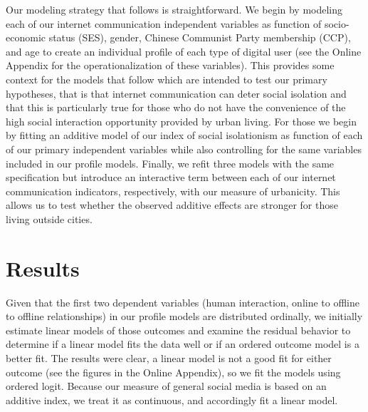 \documentclass[]{interact}
\theoremstyle{plain}%
\theoremstyle{definition}
\theoremstyle{remark}
\begin{document}
Our modeling strategy that follows is straightforward. We begin by
modeling each of our internet communication independent variables as
function of socio-economic status (SES), gender, Chinese Communist Party
membership (CCP), and age to create an individual profile of each type
of digital user (see the Online Appendix for the operationalization of
these variables). This provides some context for the models that follow
which are intended to test our primary hypotheses, that is that internet
communication can deter social isolation and that this is particularly
true for those who do not have the convenience of the high social
interaction opportunity provided by urban living. For those we begin by
fitting an additive model of our index of social isolationism as
function of each of our primary independent variables while also
controlling for the same variables included in our profile models.
Finally, we refit three models with the same specification but introduce
an interactive term between each of our internet communication
indicators, respectively, with our measure of urbanicity. This allows us
to test whether the observed additive effects are stronger for those
living outside cities.

\hypertarget{results}{%
\section{Results}\label{results}}

Given that the first two dependent variables (human interaction, online
to offline to offline relationships) in our profile models are
distributed ordinally, we initially estimate linear models of those
outcomes and examine the residual behavior to determine if a linear
model fits the data well or if an ordered outcome model is a better fit.
The results were clear, a linear model is not a good fit for either
outcome (see the figures in the Online Appendix), so we fit the models
using ordered logit. Because our measure of general social media is
based on an additive index, we treat it as continuous, and accordingly
fit a linear model.
\end{document}
